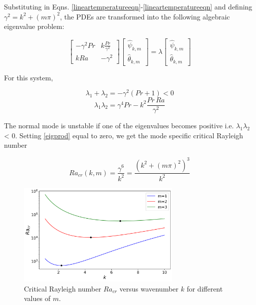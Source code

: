 \documentclass[paper=a4, fontsize=11pt]{scrartcl}
\numberwithin{equation}{section}		%
\numberwithin{figure}{section}			%
\numberwithin{table}{section}				%
\begin{document}
Substituting in Eqns. \ref{lineartemperatureeqn}-\ref{lineartemperatureeqn} and defining $\gamma^2 = k^2 + (m\pi)^2$, the PDEs are transformed into the following algebraic eigenvalue problem:

\begin{equation}
	\begin{bmatrix}
		-\gamma^2 Pr & k \frac{Pr}{\gamma^2}  \\
		 k Ra & - \gamma^2 
	\end{bmatrix}
	\begin{bmatrix}
		\hat{\psi}_{k,m} \\
		\hat{\theta}_{k,m}
	\end{bmatrix}
	=
	\lambda 
	\begin{bmatrix}
		\hat{\psi}_{k,m} \\
		\hat{\theta}_{k,m}
	\end{bmatrix}
\end{equation}

\noindent For this system,

\begin{equation}
	\lambda_1 + \lambda_2 = - \gamma^2 (Pr + 1) < 0 
\end{equation}
\begin{equation}
	\lambda_1 \lambda_2 = \gamma^4 Pr - k^2 \frac{Pr \, Ra}{\gamma^2} 
	\label{eigprod}
\end{equation}

The normal mode is unstable if one of the eigenvalues becomes positive i.e. $\lambda_1 \lambda_2$ < 0. Setting \ref{eigprod} equal to zero, we get the mode specific critical Rayleigh number 

\begin{equation}
	Ra_{cr}(k, m) = \frac{\gamma^6}{k^2} = \frac{(k^2 + (m\pi)^2)^3}{k^2}
\end{equation}

\begin{figure}[h]
	\centering
	\includegraphics[width=0.7\textwidth]{media/Ra_cr.png}
	\caption{Critical Rayleigh number $Ra_{cr}$ versus wavenumber $k$ for different values of $m$.}
	\label{fig:Ra_cr}
\end{figure}
\end{document}
